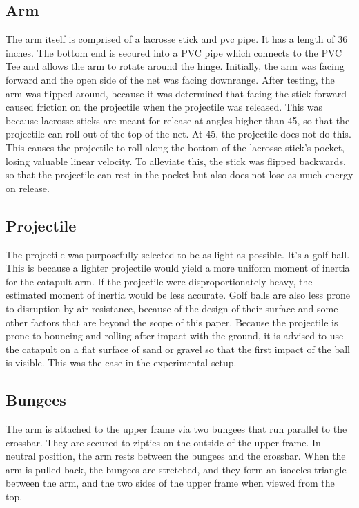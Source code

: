 \documentclass[10pt]{article}
\begin{document}
\begin{flushleft}
  \subsection{Arm}
    \par
    The arm itself is comprised of a lacrosse stick and pvc pipe.
    It has a length of 36 inches.
    The bottom end is secured into a PVC pipe which connects to the PVC Tee and allows the arm to rotate around the hinge.
    Initially, the arm was facing forward and the open side of the net was facing downrange.
    After testing, the arm was flipped around, because it was determined that facing the stick forward caused friction on the projectile when the projectile was released. 
    This was because lacrosse sticks are meant for release at angles higher than 45\textdegree, so that the projectile can roll out of the top of the net.
    At 45\textdegree, the projectile does not do this. 
    This causes the projectile to roll along the bottom of the lacrosse stick's pocket, losing valuable linear velocity.
    To alleviate this, the stick was flipped backwards, so that the projectile can rest in the pocket but also does not lose as much energy on release.

  \subsection{Projectile}
    \par
    The projectile was purposefully selected to be as light as possible. 
    It's a golf ball. 
    This is because a lighter projectile would yield a more uniform moment of inertia for the catapult arm.
    If the projectile were disproportionately heavy, the estimated moment of inertia would be less accurate.
    Golf balls are also less prone to disruption by air resistance, because of the design of their surface and some other factors that are beyond the scope of this paper.
    Because the projectile is prone to bouncing and rolling after impact with the ground, it is advised to use the catapult on a flat surface of sand or gravel so that the first impact of the ball is visible. 
    This was the case in the experimental setup.

  \subsection{Bungees}
    \par
    The arm is attached to the upper frame via two bungees that run parallel to the crossbar.
    They are secured to zipties on the outside of the upper frame.
    In neutral position, the arm rests between the bungees and the crossbar.
    When the arm is pulled back, the bungees are stretched, and they form an isoceles triangle between the arm, and the two sides of the upper frame when viewed from the top. 


\end{flushleft}
\end{document}
